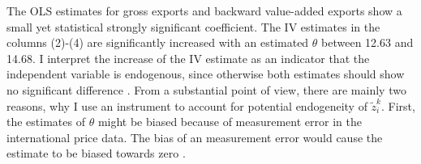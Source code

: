 \par
The OLS estimates for gross exports and backward value-added exports show a small yet statistical strongly significant coefficient.
 The IV estimates in the columns (2)-(4) are significantly increased with an estimated $\theta$ between 12.63 and 14.68.
 I interpret the increase of the IV estimate as an indicator that the independent variable is endogenous, since otherwise both estimates should show no significant difference \textcite{hausman1978}.
From a substantial point of view, there are mainly two reasons, why I use an instrument to account for potential endogeneity of $\tilde{z}^k_i $.
First, the estimates of $\theta$ might be biased because of measurement error in the international price data.
The bias of an measurement error would cause the estimate to be biased towards zero \parencite{AngristKrueger01}.
